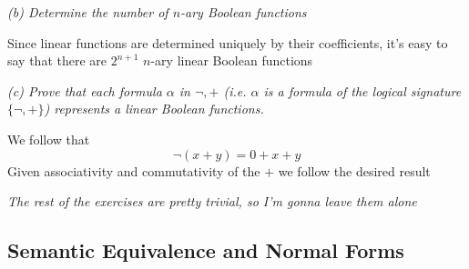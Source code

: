 \documentclass[11pt,oneside,titlepage]{book}
\newcommand{\set}[1]{\{ #1 \}}
\begin{document}
\textit{(b) Determine the number of $n$-ary Boolean functions}

Since linear functions are determined uniquely by their coefficients, it's easy to say
that there are $2^{n + 1}$ $n$-ary linear Boolean functions

\textit{(c) Prove that each formula $\alpha$ in $\neg, +$ (i.e. $\alpha$ is a formula of the
  logical signature $\set{\neg, +}$) represents a linear Boolean functions.}

We follow that
$$\neg(x + y) = 0 + x + y$$
Given associativity and commutativity of the $+$ we follow the desired result

\textit{The rest of the exercises are pretty trivial, so I'm gonna leave them alone}

\subsection{Semantic Equivalence and Normal Forms}
\end{document}
